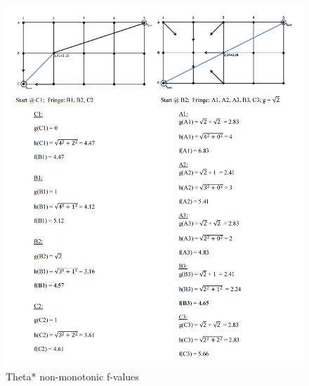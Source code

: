 \documentclass[a4paper,11pt]{report}
\begin{document}
\begin{figure}[h!]
  \centering
    \includegraphics[width=1.0\textwidth]{part_i.png}
  \caption{Theta* non-monotonic f-values}
  \label{fig:non-monotonic_theta}
\end{figure}
\end{document}
